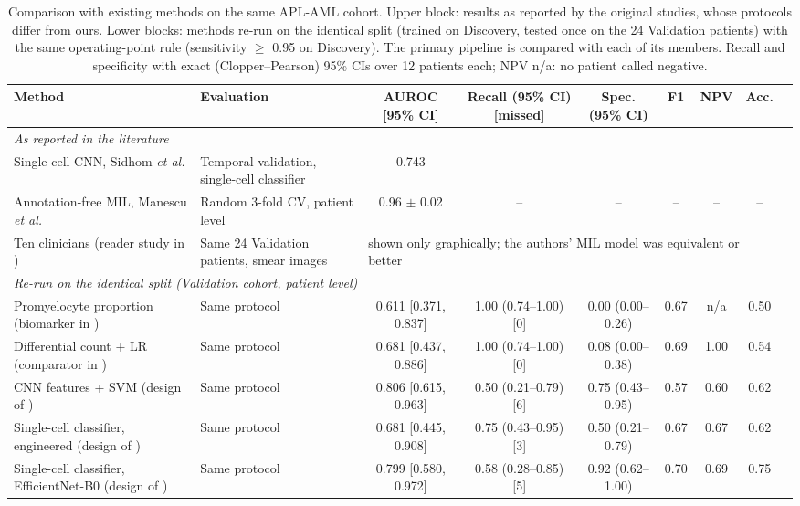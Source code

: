 \begin{table}[!t]
\centering
\caption{Comparison with existing methods on the same APL-AML cohort. Upper block: results as reported by the original studies, whose protocols differ from ours. Lower blocks: methods re-run on the identical split (trained on Discovery, tested once on the 24 Validation patients) with the same operating-point rule (sensitivity $\geq$ 0.95 on Discovery). The primary pipeline is compared with each of its members. Recall and specificity with exact (Clopper--Pearson) 95\% CIs over 12 patients each; NPV n/a: no patient called negative.}
\label{tab:compare}
\setlength{\tabcolsep}{3.5pt}
\begin{tabular}{p{4.6cm}p{3.6cm}ccccccc}
\toprule
Method & Evaluation & AUROC [95\% CI] & Recall (95\% CI) [missed] & Spec. (95\% CI) & F1 & NPV & Acc. \\
\midrule
\multicolumn{8}{l}{\emph{As reported in the literature}} \\
Single-cell CNN, Sidhom \emph{et al.} \cite{sidhom2021apl} & Temporal validation, single-cell classifier & 0.743 & -- & -- & -- & -- & -- \\
Annotation-free MIL, Manescu \emph{et al.} \cite{manescu2023apl} & Random 3-fold CV, patient level & 0.96 $\pm$ 0.02 & -- & -- & -- & -- & -- \\
Ten clinicians (reader study in \cite{sidhom2021apl}) & Same 24 Validation patients, smear images & \multicolumn{6}{l}{shown only graphically; the authors' MIL model was equivalent or better} \\
\midrule
\multicolumn{8}{l}{\emph{Re-run on the identical split (Validation cohort, patient level)}} \\
Promyelocyte proportion (biomarker in \cite{sidhom2021apl}) & Same protocol & 0.611 [0.371, 0.837] & 1.00 (0.74--1.00) [0] & 0.00 (0.00--0.26) & 0.67 & n/a & 0.50 \\
Differential count + LR (comparator in \cite{dasdelen2026caitomorph}) & Same protocol & 0.681 [0.437, 0.886] & 1.00 (0.74--1.00) [0] & 0.08 (0.00--0.38) & 0.69 & 1.00 & 0.54 \\
CNN features + SVM (design of \cite{kasim2025multiclass}) & Same protocol & 0.806 [0.615, 0.963] & 0.50 (0.21--0.79) [6] & 0.75 (0.43--0.95) & 0.57 & 0.60 & 0.62 \\
Single-cell classifier, engineered (design of \cite{sidhom2021apl}) & Same protocol & 0.681 [0.445, 0.908] & 0.75 (0.43--0.95) [3] & 0.50 (0.21--0.79) & 0.67 & 0.67 & 0.62 \\
Single-cell classifier, EfficientNet-B0 (design of \cite{sidhom2021apl}) & Same protocol & 0.799 [0.580, 0.972] & 0.58 (0.28--0.85) [5] & 0.92 (0.62--1.00) & 0.70 & 0.69 & 0.75 \\

\end{tabular}
\end{table}
